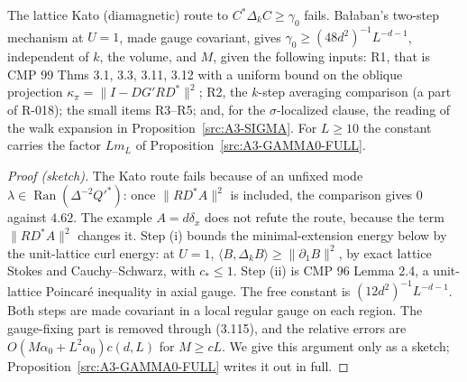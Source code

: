\begin{proposition}\label{src:A3-GAMMA0}
The lattice Kato (diamagnetic) route to $C^*\Delta_kC\ge\gamma_0$ fails. Ba{\l}aban's two-step mechanism at $U=1$, made gauge covariant, gives $\gamma_0\ge(48d^2)^{-1}L^{-d-1}$, independent of $k$, the volume, and $M$, given the following inputs: R1, that is CMP 99 Thms 3.1, 3.3, 3.11, 3.12 with a uniform bound on the oblique projection $\kappa_\pi=\|I-DG'RD^*\|^2$; R2, the $k$-step averaging comparison (a part of R-018); the small items R3--R5; and, for the $\sigma$-localized clause, the reading of the walk expansion in Proposition~\ref{src:A3-SIGMA}. For $L\ge10$ the constant carries the factor $Lm_L$ of Proposition~\ref{src:A3-GAMMA0-FULL}.
\end{proposition}
\begin{proof}[Proof (sketch)]
The Kato route fails because of an unfixed mode $\lambda\in\operatorname{Ran}(\Delta^{-2}Q'^*)$: once $\|RD^*A\|^2$ is included, the comparison gives $0$ against $4.62$. The example $A=d\delta_x$ does not refute the route, because the term $\|RD^*A\|^2$ changes it.
Step (i) bounds the minimal-extension energy below by the unit-lattice curl energy: at $U=1$, $\langle B,\Delta_kB\rangle\ge\|\partial_1B\|^2$, by exact lattice Stokes and Cauchy--Schwarz, with $c_*\le1$. Step (ii) is CMP 96 Lemma 2.4, a unit-lattice Poincar\'e inequality in axial gauge. The free constant is $(12d^2)^{-1}L^{-d-1}$. Both steps are made covariant in a local regular gauge on each region. The gauge-fixing part is removed through (3.115), and the relative errors are $O(M\alpha_0+L^2\alpha_0)c(d,L)$ for $M\ge cL$. We give this argument only as a sketch; Proposition~\ref{src:A3-GAMMA0-FULL} writes it out in full.
\end{proof}

